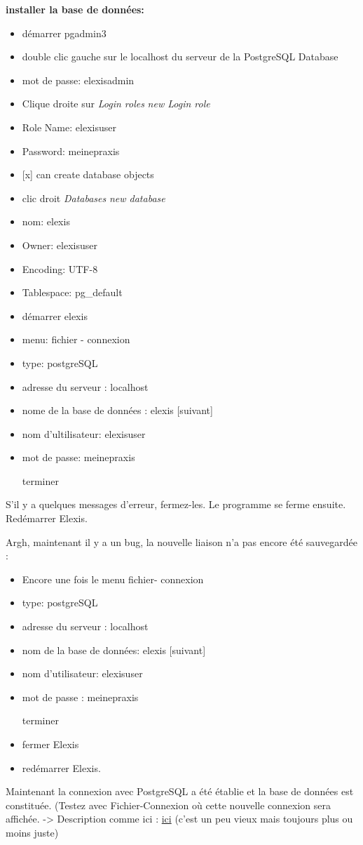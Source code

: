 \textbf{installer la base de données:}

\begin{itemize}
\item démarrer pgadmin3
\item double clic gauche sur le localhost du serveur de la PostgreSQL Database
\item mot de passe: elexisadmin
\item Clique droite sur \textit{Login roles}
\textit{new Login role}
\item Role Name: elexisuser
\item Password: meinepraxis
\item {[x]} can create database objects
\item clic droit \textit{Databases}
\textit{new database}
\item nom: elexis
\item Owner: elexisuser
\item Encoding: UTF-8
\item Tablespace: pg\_default
\item démarrer elexis
\item menu: fichier - connexion 
\item type: postgreSQL
\item adresse du serveur : localhost
\item nome de la base de données : elexis [suivant]
\item nom d'ultilisateur: elexisuser
\item mot de passe: meinepraxis
\item [terminer]
\end{itemize}

S'il y a quelques messages d'erreur, fermez-les. Le programme se ferme ensuite. Redémarrer Elexis. 

Argh, maintenant il y a un bug, la nouvelle liaison n'a pas encore été sauvegardée :

\begin{itemize}
 \item Encore une fois le menu fichier- connexion
\item type: postgreSQL
\item adresse du serveur : localhost
\item nom de la base de données: elexis [suivant]
\item nom d'utilisateur: elexisuser
\item mot de passe : meinepraxis
\item [terminer]
\item fermer Elexis
\item redémarrer Elexis.
\end{itemize}
Maintenant la connexion avec PostgreSQL a été établie et la base de données est constituée. (Testez avec Fichier-Connexion où cette nouvelle connexion sera affichée.
-{>} Description comme ici : \href{http://www.elexis.ch/jp/content/view/51/47/}{ici}
(c'est un peu vieux mais toujours plus ou moins juste)


